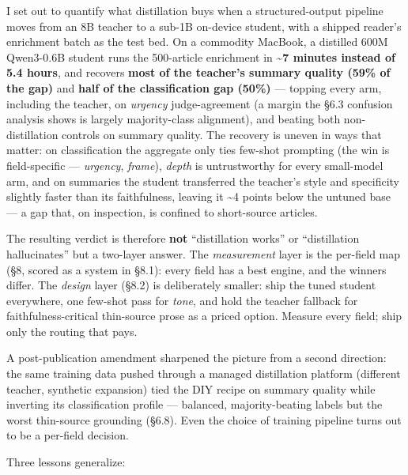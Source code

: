\documentclass[11pt]{article}
\begin{document}
I set out to quantify what distillation buys when a structured-output
pipeline moves from an 8B teacher to a sub-1B on-device student, with a
shipped reader's enrichment batch as the test bed. On a commodity
MacBook, a distilled 600M Qwen3-0.6B student runs the 500-article
enrichment in \textbf{\textasciitilde7 minutes instead of 5.4 hours},
and recovers \textbf{most of the teacher's summary quality (59\% of the
gap)} and \textbf{half of the classification gap (50\%)} --- topping
every arm, including the teacher, on \emph{urgency} judge-agreement (a
margin the §6.3 confusion analysis shows is largely majority-class
alignment), and beating both non-distillation controls on summary
quality. The recovery is uneven in ways that matter: on classification
the aggregate only ties few-shot prompting (the win is field-specific
--- \emph{urgency}, \emph{frame}), \emph{depth} is untrustworthy for
every small-model arm, and on summaries the student transferred the
teacher's style and specificity slightly faster than its faithfulness,
leaving it \textasciitilde4 points below the untuned base --- a gap
that, on inspection, is confined to short-source articles.

The resulting verdict is therefore \textbf{not} ``distillation works''
or ``distillation hallucinates'' but a two-layer answer. The
\emph{measurement} layer is the per-field map (§8, scored as a system in
§8.1): every field has a best engine, and the winners differ. The
\emph{design} layer (§8.2) is deliberately smaller: ship the tuned
student everywhere, one few-shot pass for \emph{tone}, and hold the
teacher fallback for faithfulness-critical thin-source prose as a priced
option. Measure every field; ship only the routing that pays.

A post-publication amendment sharpened the picture from a second
direction: the same training data pushed through a managed distillation
platform (different teacher, synthetic expansion) tied the DIY recipe on
summary quality while inverting its classification profile --- balanced,
majority-beating labels but the worst thin-source grounding (§6.8). Even
the choice of training pipeline turns out to be a per-field decision.

Three lessons generalize:
\end{document}
